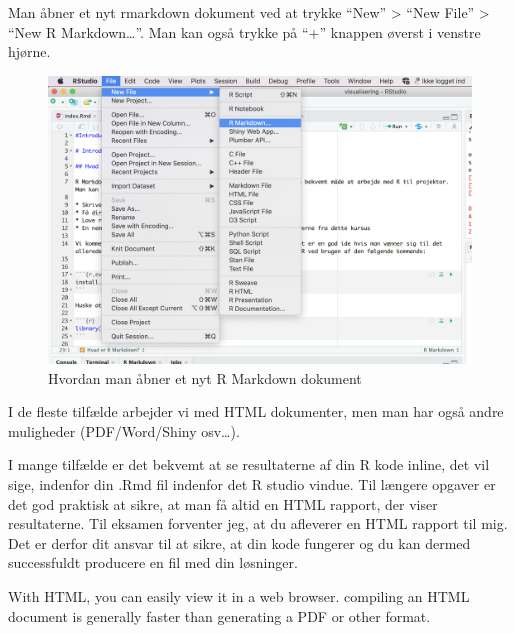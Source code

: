 \documentclass[
]{book}
\begin{document}
Man åbner et nyt rmarkdown dokument ved at trykke ``New'' \textgreater{} ``New File'' \textgreater{} ``New R Markdown\ldots{}''. Man kan også trykke på ``+'' knappen øverst i venstre hjørne.

\begin{figure}
\centering
\includegraphics{plots/open_new_rmarkdown.png}
\caption{Hvordan man åbner et nyt R Markdown dokument}
\end{figure}

I de fleste tilfælde arbejder vi med HTML dokumenter, men man har også andre muligheder (PDF/Word/Shiny osv\ldots).

I mange tilfælde er det bekvemt at se resultaterne af din R kode inline, det vil sige, indenfor din .Rmd fil indenfor det R studio vindue. Til længere opgaver er det god praktisk at sikre, at man få altid en HTML rapport, der viser resultaterne. Til eksamen forventer jeg, at du afleverer en HTML rapport til mig. Det er derfor dit ansvar til at sikre, at din kode fungerer og du kan dermed successfuldt producere en fil med din løsninger.

With HTML, you can easily view it in a web browser. compiling an HTML document is generally faster than generating a PDF or other format.
\end{document}
